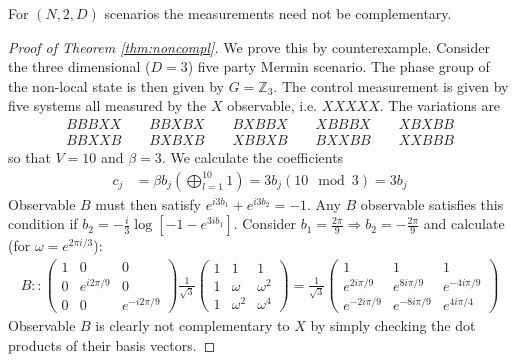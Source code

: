 \begin{theorem}
\label{thm:noncompl}
For $(N,2,D)$ scenarios the measurements need not be complementary.
\end{theorem}
\begin{proof}[Proof of Theorem \ref{thm:noncompl}]
We prove this by counterexample.  Consider the three dimensional  ($D=3$) five party Mermin scenario.  The phase group of the non-local state is then given by $G=\mathbb{Z}_3$.
The control measurement is given by five systems all measured by the $X$ observable, i.e. $XXXXX$. The variations are
\begin{align*}
BBBXX \qquad BBXBX \qquad BXBBX \qquad XBBBX \qquad XBXBB \\
BBXXB \qquad BXBXB \qquad XBBXB \qquad BXXBB \qquad XXBBB
\end{align*}
so that $V = 10$ and $\beta = 3$. We calculate the coefficients
\begin{align*} c_j &= \beta b_j \left(\bigoplus^{10}_{l=1}1\right)= 3b_j (10\mod 3) = 3b_j
\end{align*}
Observable $B$ must then satisfy $e^{i3b_1}+e^{i3b_2} = -1$. Any $B$ observable satisfies this condition if  $b_2 = -\frac{i}{3}\log\left[-1-e^{3ib_1}\right]$.
Consider $b_1 = \frac{2\pi}{9} \Rightarrow b_2 =- \frac{2\pi}{9}$ and calculate (for $\omega = e^{2\pi i/3}$):
\begin{align*}
B :: \left(\begin{array}{ccc}1 & 0 & 0 \\ 0 & e^{i2\pi/9} & 0 \\ 0 & 0 & e^{-i2\pi/9} \end{array}\right) \frac{1}{\sqrt{3}}
\left(\begin{array}{ccc}1 & 1 & 1 \\ 1 & \omega & \omega^2 \\ 1 & \omega^2 & \omega^4  \end{array}\right) 
= \frac{1}{\sqrt{3}}\left(\begin{array}{ccc}1 & 1 & 1 \\ e^{2i\pi/9} & e^{8i\pi/9} & e^{-4i\pi/9} \\ e^{-2i\pi/9} & e^{-8i\pi/9} & e^{4i\pi/4} \end{array}\right)
\end{align*}
Observable $B$ is clearly not complementary to $X$ by simply checking the dot products of their basis vectors.
\end{proof}

